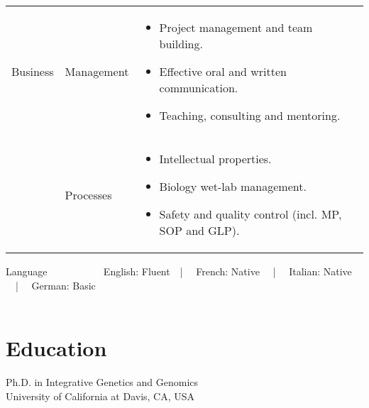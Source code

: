 \documentclass{CV}
\begin{document}
\begin{tabular}{p{} p{} p{}}
Business & 
	Management &
		\begin{itemize}\setlength\itemsep{-0.5em}
		\vspace{-1.8em}
		\item Project management and team building.
		\item Effective oral and written communication.
		\item Teaching, consulting and mentoring.
		\end{itemize}\\
& 
	Processes &
		\begin{itemize}\setlength\itemsep{-0.5em}
		\vspace{-1.8em}
		\item Intellectual properties.
		\item Biology wet-lab management.
		\item Safety and quality control (incl. MP, SOP and GLP).
		\end{itemize}\\
\end{tabular}
Language ~~~~~~~~~~ English: Fluent~~|~~ French: Native ~~|~~ Italian: Native ~~|~~ German: Basic\\
\\






\section*{Education}
Ph.D. in  Integrative Genetics and Genomics  \hfill {}\\
University of California at Davis, CA, USA\\

\end{document}
